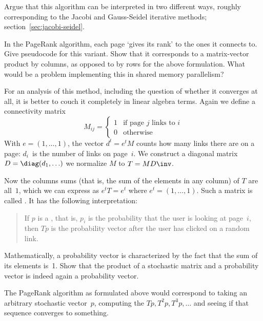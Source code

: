\begin{exercise}
  Argue that this algorithm can be interpreted in two different ways,
  roughly corresponding to the Jacobi and Gauss-Seidel iterative
  methods; section~\ref{sec:jacobi-seidel}.
\end{exercise}

\begin{exercise}
  In the PageRank algorithm, each page `gives its rank' to the ones it
  connects to. Give pseudocode for this variant. Show that it
  corresponds to a matrix-vector product by columns, as opposed to by
  rows for the above formulation. What would be a problem implementing
  this in shared memory parallelism?
\end{exercise}

For an analysis of this method, including the question of whether it
converges at all, it is better to couch it completely in
linear algebra terms.
Again we define a connectivity matrix
\[ M_{ij}=
\begin{cases}
  1&\mbox{if page $j$ links to $i$}\\
  0&\mbox{otherwise}
\end{cases}
\]
With $e=(1,\ldots,1)$, the vector $d^t=e^tM$ counts how many links
there are on a page: $d_i$~is the number of links on page~$i$. We
construct a diagonal matrix $D=\diag(d_1,\ldots)$ we normalize $M$ to
$T=MD\inv$. 

Now the columns sums (that is, the sum of the elements in any column)
of $T$ are all~$1$, which we can express as $e^tT=e^t$ where
$e^t=(1,\ldots,1)$. Such a matrix is
called . It has the following
interpretation:
\begin{quote}
  If $p$ is a , that is, $p_i$ is the
  probability that the user is looking at page~$i$, then $Tp$ is the
  probability vector after the user has clicked on a random link.
\end{quote}

\begin{exercise}
  Mathematically, a probability vector is characterized by the fact
  that the sum of its elements is~1. Show that the product of a
  stochastic matrix and a probability vector is indeed again a
  probability vector.
\end{exercise}

The PageRank algorithm as formulated above
would correspond to taking an
arbitrary stochastic vector~$p$, computing the 
$Tp,T^2p,T^3p,\ldots$ and
seeing if that sequence converges to something.

